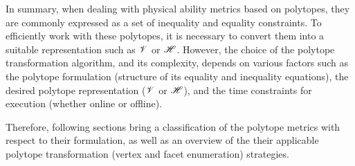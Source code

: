 In summary, when dealing with physical ability metrics based on polytopes, they are commonly expressed as a set of inequality and equality constraints. To efficiently work with these polytopes, it is necessary to convert them into a suitable representation such as $\mathscr{V}$ or $\mathscr{H}$. However, the choice of the polytope transformation algorithm, and its complexity, depends on various factors such as the polytope formulation (structure of its equality and inequality equations), the desired polytope representation ($\mathscr{V}$ or $\mathscr{H}$), and the time constraints for execution (whether online or offline). 

Therefore, following sections bring a classification of the polytope metrics with respect to their formulation, as well as an overview of the their applicable polytope transformation (vertex and facet enumeration) strategies.


